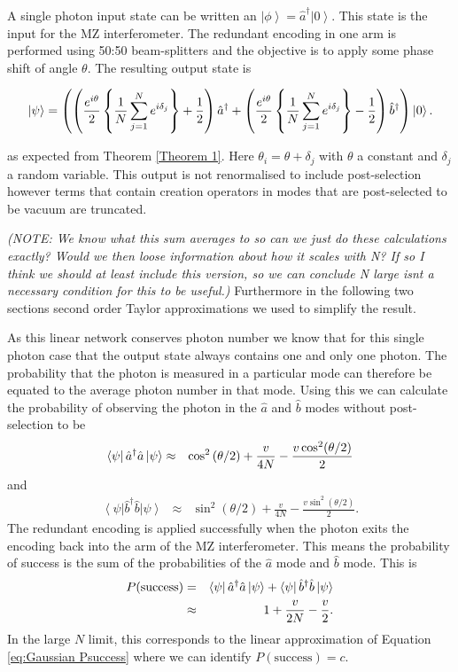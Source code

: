 \documentclass[aps,pra,twocolumn,superscriptaddress,numerical,floatfix]{revtex4-1}
\begin{document}
A single photon input state can be written an $\left|\phi\right\rangle = \hat{a}^{\dagger}\left|0\right\rangle $.  This state is the input for the MZ interferometer.  The redundant encoding in one arm is performed using 50:50 beam-splitters and the objective is to apply some phase shift of angle $\theta$.  The resulting output state is
\begin{widetext}
\begin{equation}
	\ket{\psi} = \left(
	\left( \frac{e^{i\theta}}{2} \left\{\frac{1}{N}\sum_{j=1}^{N}e^{i\delta_{j}}\right\} + \frac{1}{2}\right) \hat{a}^{\dagger} 
	+ \left(\frac{e^{i\theta}}{2} \left\{\frac{1}{N}\sum_{j=1}^{N}e^{i\delta_{j}}\right\} - \frac{1}{2}\right) \hat{b}^{\dagger} 
	\right)
	\ket{0}.
	\label{eq:1ParbN}
\end{equation}
\end{widetext}
as expected from Theorem \ref{Theorem 1}. Here $\theta_{i}=\theta+\delta_{j}$ with $\theta$ a constant and $\delta_j$ a random variable.  This output is not renormalised to include post-selection however terms that contain creation operators in modes that are post-selected to be vacuum are truncated. 

\emph{(NOTE: We know what this sum averages to so can we just do these calculations exactly? Would we then loose information about how it scales with N? If so I think we should at least include this version, so we can conclude N large isnt a necessary condition for this to be useful.)}
Furthermore  in the following two sections second order Taylor approximations we used to simplify the result. 

As this linear network conserves photon number we know that for this single photon case that the output state always contains one and only one photon.  The probability that the photon is measured in a particular mode can therefore be equated to the average photon number in that mode.  Using this we can calculate the probability of observing the photon in the $\hat{a}$ and $\hat{b}$ modes without post-selection to be 
\begin{eqnarray}
	\bra{\psi} \hat{a}^{\dagger}\hat{a} \ket{\psi} & \approx & \cos^{2}\left(\theta/2\right)+\frac{v}{4N}-\frac{v\cos^{2}(\theta/2)}{2}
\end{eqnarray}
and
\begin{eqnarray}
	\left\langle \psi\right|\hat{b}^{\dagger}\hat{b}\left|\psi\right\rangle & \approx & \sin^{2}\left(\theta/2\right)+\frac{v}{4N}-\frac{v\sin^{2}(\theta/2)}{2}.
\end{eqnarray}
The redundant encoding is applied successfully when the photon exits the encoding back into the arm of the MZ interferometer.  This means the probability of success is the sum of the probabilities of the $\hat{a}$ mode and $\hat{b}$ mode.  This is 
\begin{eqnarray}
	P(\textrm{success}) & = & \bra{\psi}\hat{a}^{\dagger}\hat{a}\ket{\psi} +\bra{\psi}\hat{b}^{\dagger}\hat{b}\ket{\psi} \\
	& \approx & 1+\frac{v}{2N}-\frac{v}{2}. \label{eq:1pNarbitrary successs}
\end{eqnarray}
In the large $N$ limit, this corresponds to the linear approximation of Equation \ref{eq:Gaussian Psuccess} where we can identify $P(\textrm{success})=c$. 
\end{document}
